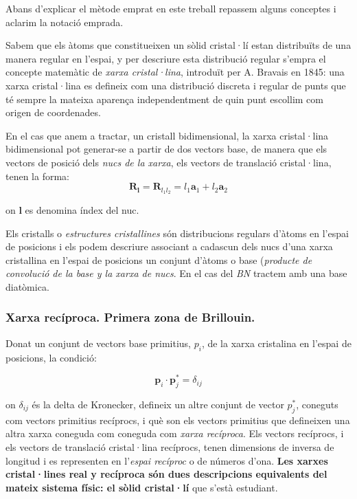 \documentclass[12pt]{article} %
\let\vec\mathbf %
\begin{document}
Abans d'explicar el mètode emprat en este treball repassem alguns conceptes i aclarim la notació emprada.

Sabem que els àtoms que constitueixen un sòlid cristal·lí estan distribuïts de una manera regular en l'espai, y per descriure esta distribució regular s'empra el concepte matemàtic de \emph{xarxa cristal·lina}, introduït per A. Bravais en 1845: una xarxa cristal·lina es defineix com una distribució discreta i regular de punts que té sempre la mateixa aparença independentment de quin punt escollim com origen de coordenades.

En el cas que anem a tractar, un cristall bidimensional, la xarxa cristal·lina bidimensional pot generar-se a partir de dos vectors base, de manera que els vectors de posició dels \emph{nucs de la xarxa}, els vectors de translació cristal·lina,  tenen la forma:
\begin{equation}
 \vec R_\vec l=\vec R_{l_1 l_2}=l_1 \vec a_1 +l_2\vec a_2
\end{equation}

on $\vec l$ es denomina índex del nuc.

Els cristalls o \emph{estructures cristallines} són distribucions regulars d'àtoms en l'espai de posicions i els podem descriure associant a cadascun dels nucs d'una xarxa cristallina en l'espai de posicions un conjunt d'àtoms o base (\emph{producte de convolució de la base y la xarxa de nucs}. En el cas del \emph{BN} tractem amb una base diatòmica. 

\subsubsection{Xarxa recíproca. Primera zona de Brillouin.}
Donat un conjunt de vectors base primitius, $p_i$, de la xarxa cristalina en l'espai de posicions, la condició:

\begin{equation}
\label{eq:rec1}
\vec p_i\cdot\vec p_j^{*}=\delta_{ij}
\end{equation}

on $\delta_{ij}$ és la delta de Kronecker, defineix un altre conjunt de vector $p_j^*$, coneguts com vectors primitius recíprocs, i què son els vectors primitius que defineixen una altra xarxa coneguda com coneguda com \textit{xarxa recíproca}. Els  vectors recíprocs, i els vectors de translació cristal·lina recíprocs, tenen dimensions de inversa de longitud i es representen en l'\textit{espai recíproc} o de números d'ona. \textbf{Les xarxes cristal·lines real y recíproca són dues descripcions equivalents del mateix sistema físic: el sòlid cristal·lí} que s'està estudiant.
\end{document}
